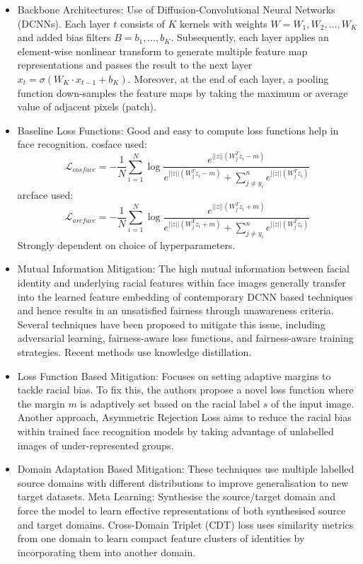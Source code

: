 \documentclass[12pt]{article}
\begin{document}
\begin{itemize}
  \item Backbone Architectures: Use of Diffusion-Convolutional Neural Networks (DCNNs). Each layer $t$ consists of $K$ kernels with weights $W = W_1, W_2, \ldots, W_K$ and added bias filters $B= b_1,\ldots, b_K$. Subsequently, each layer applies an element-wise nonlinear transform to generate multiple feature map representations and passes the result to the next layer $x_t = \sigma(W_K\cdot x_{t-1} + b_K)$. Moreover, at the end of each layer, a pooling function down-samples the feature
  maps by taking the maximum or average value of adjacent pixels (patch).
  \item Baseline Loss Functions: Good and easy to compute loss functions help in face recognition. cosface used:
  \[\mathcal{L}_{cosface} = -\dfrac{1}{N}\sum_{i=1}^{N}\log\dfrac{e^{||z||(W^T_jz_i-m)}}{e^{||z||(W^T_jz_i-m)}+\sum_{j\neq y_i}^{n}e^{||z||(W^T_jz_i)}}\]
  arcface used:
  \[\mathcal{L}_{arcface} = -\dfrac{1}{N}\sum_{i=1}^{N}\log\dfrac{e^{||z||(W^T_jz_i+m)}}{e^{||z||(W^T_jz_i+m)}+\sum_{j\neq y_i}^{n}e^{||z||(W^T_jz_i)}}\]
  Strongly dependent on choice of hyperparameters.
  \item Mutual Information Mitigation: The high mutual information between facial identity and underlying racial
  features within face images generally transfer into the learned feature embedding of contemporary DCNN based techniques and hence results in an unsatisfied fairness through unawareness criteria. Several techniques have been proposed to mitigate this issue, including adversarial learning, fairness-aware loss functions, and fairness-aware training strategies. Recent methods use knowledge distillation.
  \item Loss Function Based Mitigation: Focuses on setting adaptive margins to
  tackle racial bias. To fix this, the authors propose a novel loss function where the margin $m$ is adaptively set based on the racial label $s$ of the input image. Another approach, Asymmetric Rejection Loss aims to reduce the racial bias within trained face
  recognition models by taking advantage of unlabelled images of under-represented groups.
  \item Domain Adaptation Based Mitigation: These techniques use multiple labelled source domains with different distributions to improve
  generalisation to new target datasets. Meta Learning: Synthesise the source/target
  domain and force the model to learn effective representations of both synthesised source and target
  domains. Cross-Domain Triplet (CDT) loss uses similarity metrics from one domain to learn compact feature clusters of identities by incorporating
  them into another domain.
\end{itemize}
\end{document}

